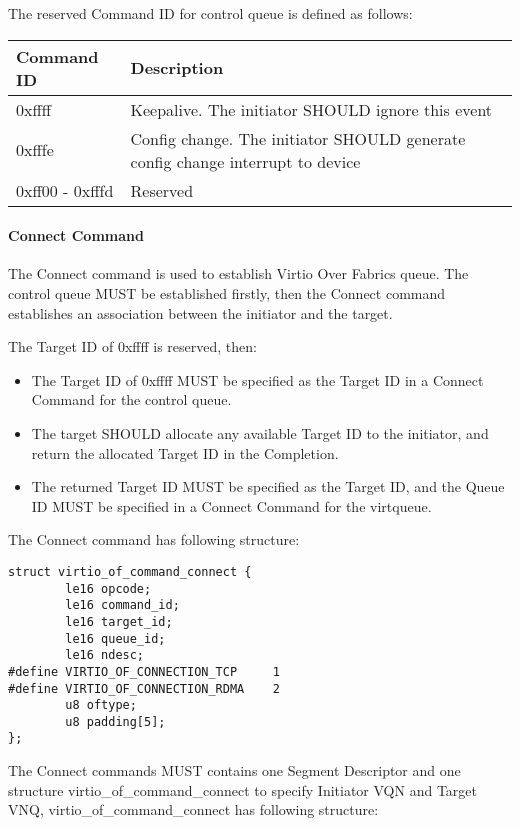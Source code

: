 The reserved Command ID for control queue is defined as follows:

\begin{tabular}{ |l|l| }
\hline
Command ID & Description \\
\hline \hline
0xffff & Keepalive. The initiator SHOULD ignore this event \\
\hline
0xfffe & Config change. The initiator SHOULD generate config change interrupt to device \\
\hline
0xff00 - 0xfffd & Reserved \\
\hline
\end{tabular}

\paragraph{Connect Command}\label{sec:Virtio Transport Options / Virtio Over Fabrics / Transmission Protocol / Commands Definition / Connect Command}
The Connect command is used to establish Virtio Over Fabrics queue. The control
queue MUST be established firstly, then the Connect command establishes an
association between the initiator and the target.

The Target ID of 0xffff is reserved, then:
\begin{itemize}
\item The Target ID of 0xffff MUST be specified as the Target ID in a Connect
Command for the control queue.
\item The target SHOULD allocate any available Target ID to the initiator,
and return the allocated Target ID in the Completion.
\item The returned Target ID MUST be specified as the Target ID, and the Queue ID
MUST be specified in a Connect Command for the virtqueue.
\end{itemize}

The Connect command has following structure:

\begin{lstlisting}
struct virtio_of_command_connect {
        le16 opcode;
        le16 command_id;
        le16 target_id;
        le16 queue_id;
        le16 ndesc;
#define VIRTIO_OF_CONNECTION_TCP     1
#define VIRTIO_OF_CONNECTION_RDMA    2
        u8 oftype;
        u8 padding[5];
};
\end{lstlisting}

The Connect commands MUST contains one Segment Descriptor and one structure
virtio_of_command_connect to specify Initiator VQN and Target VNQ,
virtio_of_command_connect has following structure:

